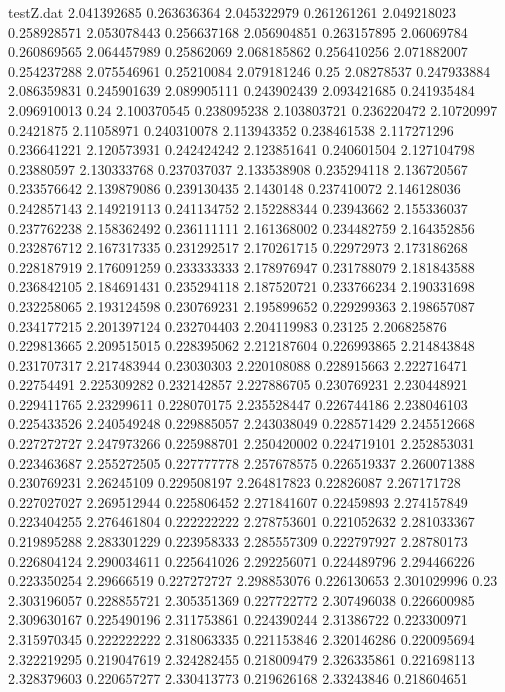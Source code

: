 \begin{filecontents*}{testZ.dat}
2.041392685  0.263636364
2.045322979  0.261261261
2.049218023  0.258928571
2.053078443  0.256637168
2.056904851  0.263157895
2.06069784  0.260869565
2.064457989  0.25862069
2.068185862  0.256410256
2.071882007  0.254237288
2.075546961  0.25210084
2.079181246  0.25
2.08278537  0.247933884
2.086359831  0.245901639
2.089905111  0.243902439
2.093421685  0.241935484
2.096910013  0.24
2.100370545  0.238095238
2.103803721  0.236220472
2.10720997  0.2421875
2.11058971  0.240310078
2.113943352  0.238461538
2.117271296  0.236641221
2.120573931  0.242424242
2.123851641  0.240601504
2.127104798  0.23880597
2.130333768  0.237037037
2.133538908  0.235294118
2.136720567  0.233576642
2.139879086  0.239130435
2.1430148  0.237410072
2.146128036  0.242857143
2.149219113  0.241134752
2.152288344  0.23943662
2.155336037  0.237762238
2.158362492  0.236111111
2.161368002  0.234482759
2.164352856  0.232876712
2.167317335  0.231292517
2.170261715  0.22972973
2.173186268  0.228187919
2.176091259  0.233333333
2.178976947  0.231788079
2.181843588  0.236842105
2.184691431  0.235294118
2.187520721  0.233766234
2.190331698  0.232258065
2.193124598  0.230769231
2.195899652  0.229299363
2.198657087  0.234177215
2.201397124  0.232704403
2.204119983  0.23125
2.206825876  0.229813665
2.209515015  0.228395062
2.212187604  0.226993865
2.214843848  0.231707317
2.217483944  0.23030303
2.220108088  0.228915663
2.222716471  0.22754491
2.225309282  0.232142857
2.227886705  0.230769231
2.230448921  0.229411765
2.23299611  0.228070175
2.235528447  0.226744186
2.238046103  0.225433526
2.240549248  0.229885057
2.243038049  0.228571429
2.245512668  0.227272727
2.247973266  0.225988701
2.250420002  0.224719101
2.252853031  0.223463687
2.255272505  0.227777778
2.257678575  0.226519337
2.260071388  0.230769231
2.26245109  0.229508197
2.264817823  0.22826087
2.267171728  0.227027027
2.269512944  0.225806452
2.271841607  0.22459893
2.274157849  0.223404255
2.276461804  0.222222222
2.278753601  0.221052632
2.281033367  0.219895288
2.283301229  0.223958333
2.285557309  0.222797927
2.28780173  0.226804124
2.290034611  0.225641026
2.292256071  0.224489796
2.294466226  0.223350254
2.29666519  0.227272727
2.298853076  0.226130653
2.301029996  0.23
2.303196057  0.228855721
2.305351369  0.227722772
2.307496038  0.226600985
2.309630167  0.225490196
2.311753861  0.224390244
2.31386722  0.223300971
2.315970345  0.222222222
2.318063335  0.221153846
2.320146286  0.220095694
2.322219295  0.219047619
2.324282455  0.218009479
2.326335861  0.221698113
2.328379603  0.220657277
2.330413773  0.219626168
2.33243846  0.218604651

\end{filecontents*}
